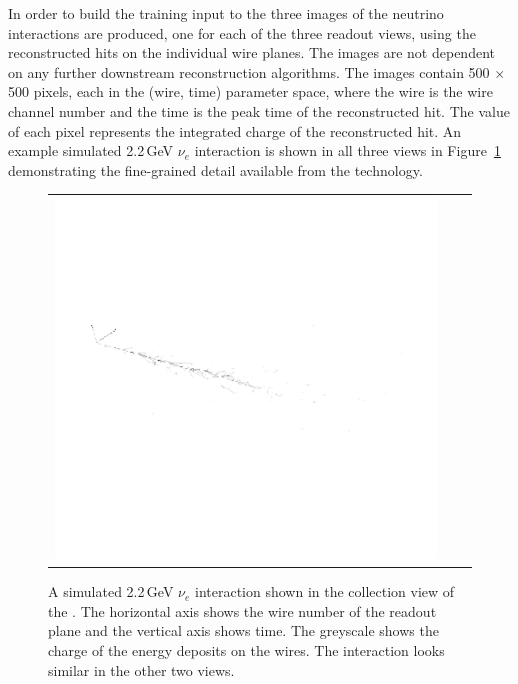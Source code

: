 In order to build the training input to the   three images of the neutrino interactions are produced, one for each of the three readout views, using the reconstructed hits on the individual wire planes. The images are not dependent on any further downstream reconstruction algorithms. The images contain 500 $\times$ 500 pixels, each in the (wire, time) parameter space, where the wire is the wire channel number and the time is the peak time of the reconstructed hit. 
The value of each pixel represents the integrated charge of the reconstructed hit. An example simulated 2.2\,GeV $\nu_{e}$  interaction is shown in all three views in Figure~\ref{fig:views} demonstrating the fine-grained detail available from the  technology.

\begin{figure}[htb] 
\centering
	\begin{tabular}{ccc}
		\includegraphics[trim=1cm 4cm 5cm 3cm, clip, scale=2.0]{graphics/cvn_nue_view2.pdf}
    \end{tabular}

\caption[A simulated \SI{2.2}{GeV} \nue CC interaction viewed by collection wires in the SP \lartpc]{A simulated 2.2\,GeV $\nu_{e}$  interaction shown in the collection view of the  . The horizontal axis shows the wire number of the readout plane and the vertical axis shows time. The greyscale shows the charge of the energy deposits on the wires. The interaction looks similar in the other two views.}
	\label{fig:views}
\end{figure}



